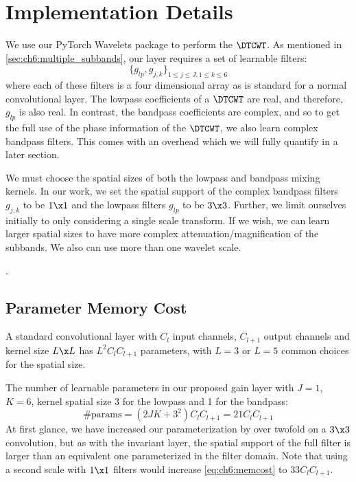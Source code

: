 \section{Implementation Details}

We use our PyTorch Wavelets package \cite{cotter_pytorch_2018} to perform the $\DTCWT$. As
mentioned in \autoref{sec:ch6:multiple_subbands}, our layer requires a set
of learnable filters:
\begin{equation}
  \{ g_{lp}, g_{j,k} \}_{1\leq j \leq J, 1\leq k\leq 6}
\end{equation}
where each of these filters is a four dimensional array as is standard for a
normal convolutional layer. The lowpass coefficients of a $\DTCWT$ are real, and
therefore, $g_{lp}$ is also real. In contrast, the bandpass coefficients are
complex, and so to get the full use of the phase information of the $\DTCWT$, we
also learn complex bandpass filters. This comes with an overhead which we will 
fully quantify in a later section.

We must choose the spatial sizes of both the lowpass and bandpass
mixing kernels. In our work, we set the spatial support of the complex bandpass
filters $g_{j,k}$ to be $1\x 1$ and the lowpass filters $g_{lp}$ to be $3\x 3$.
Further, we limit ourselves initially to only considering a single scale
transform.  
If we wish, we can learn larger spatial sizes to have more complex
attenuation/magnification of the subbands. We also can use more than
one wavelet scale. 

. 

\subsection{Parameter Memory Cost}\label{sec:ch6:memory}
A standard convolutional layer with $C_l$ input channels, $C_{l+1}$ output channels
and kernel size $L\x L$ has $L^2C_{l}C_{l+1}$ parameters, with $L=3$ or $L=5$
common choices for the spatial size.

The number of learnable parameters in our proposed gain layer with
$J=1$, $K=6$, kernel spatial size 3 for the lowpass and 1 for the bandpass:
%
\begin{equation}
  \text{\#params} = (2JK + 3^2)C_lC_{l+1} = 21C_lC_{l+1} \label{eq:ch6:memcost}
\end{equation} 
%
At first glance, we have increased our parameterization by over twofold on a $3\x 3$ 
convolution, but as with the invariant layer, the spatial support of the full
filter is larger than an equivalent one parameterized in the filter domain. Note
that using a second scale with $1\x 1$ filters would increase
\eqref{eq:ch6:memcost} to $33C_lC_{l+1}$.

